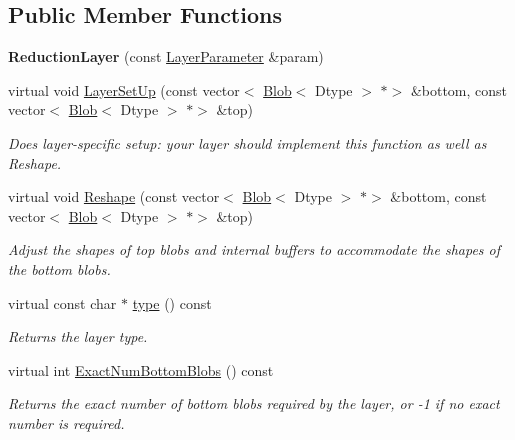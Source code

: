 \subsection*{Public Member Functions}
\begin{DoxyCompactItemize}
\item 
\mbox{\label{classcaffe_1_1_reduction_layer_aefb1d51cf2b4ce4248d9614267191e4d}} 
{\bfseries Reduction\+Layer} (const \mbox{\hyperlink{classcaffe_1_1_layer_parameter}{Layer\+Parameter}} \&param)
\item 
virtual void \mbox{\hyperlink{classcaffe_1_1_reduction_layer_aafe0aa825e019ea35225a8e493e4e919}{Layer\+Set\+Up}} (const vector$<$ \mbox{\hyperlink{classcaffe_1_1_blob}{Blob}}$<$ Dtype $>$ $\ast$$>$ \&bottom, const vector$<$ \mbox{\hyperlink{classcaffe_1_1_blob}{Blob}}$<$ Dtype $>$ $\ast$$>$ \&top)
\begin{DoxyCompactList}\small\item\em Does layer-\/specific setup\+: your layer should implement this function as well as Reshape. \end{DoxyCompactList}\item 
virtual void \mbox{\hyperlink{classcaffe_1_1_reduction_layer_a0f6594ec41a0556e9fcfb9af0ae86c8a}{Reshape}} (const vector$<$ \mbox{\hyperlink{classcaffe_1_1_blob}{Blob}}$<$ Dtype $>$ $\ast$$>$ \&bottom, const vector$<$ \mbox{\hyperlink{classcaffe_1_1_blob}{Blob}}$<$ Dtype $>$ $\ast$$>$ \&top)
\begin{DoxyCompactList}\small\item\em Adjust the shapes of top blobs and internal buffers to accommodate the shapes of the bottom blobs. \end{DoxyCompactList}\item 
\mbox{\label{classcaffe_1_1_reduction_layer_aafc754e45877961380a214e5410033ed}} 
virtual const char $\ast$ \mbox{\hyperlink{classcaffe_1_1_reduction_layer_aafc754e45877961380a214e5410033ed}{type}} () const
\begin{DoxyCompactList}\small\item\em Returns the layer type. \end{DoxyCompactList}\item 
virtual int \mbox{\hyperlink{classcaffe_1_1_reduction_layer_a64694af2e56723590072cac88bf825c7}{Exact\+Num\+Bottom\+Blobs}} () const
\begin{DoxyCompactList}\small\item\em Returns the exact number of bottom blobs required by the layer, or -\/1 if no exact number is required. \end{DoxyCompactList}\item 

\end{DoxyCompactItemize}

